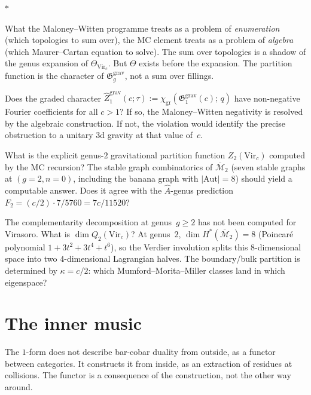 \documentclass[11pt]{article}
\newcommand{\cM}{\mathcal{M}}
\newcommand{\sep}{\bigskip\begin{center}$*$\end{center}\medskip}
\begin{document}
\sep

What the Maloney--Witten programme treats as a problem of
\emph{enumeration} (which topologies to sum over), the MC element
treats as a problem of \emph{algebra} (which Maurer--Cartan
equation to solve).  The sum over topologies is a shadow of the
genus expansion of $\Theta_{\mathrm{Vir}_c}$.  But $\Theta$
exists before the expansion.  The partition function is the
character of $\mathfrak{G}_g^{\mathrm{grav}}$, not a sum over
fillings.

\begin{question}
Does the graded character
$\hat{Z}_1^{\mathrm{grav}}(c;\tau) :=
\chi_{\mathrm{gr}}(\mathfrak{G}_1^{\mathrm{grav}}(c);\,q)$
have non-negative Fourier coefficients for all $c > 1$?
If so, the Maloney--Witten negativity is resolved by the
algebraic construction.  If not, the violation would identify the
precise obstruction to a unitary 3d gravity at that value of~$c$.
\end{question}

\begin{question}
What is the explicit genus-$2$ gravitational partition function
$Z_2(\mathrm{Vir}_c)$ computed by the MC recursion?  The stable
graph combinatorics of $\overline{\cM}_2$ (seven stable graphs at
$(g{=}2, n{=}0)$, including the banana graph with
$|\mathrm{Aut}| = 8$) should yield a computable answer.
Does it agree with the $\hat{A}$-genus prediction
$F_2 = (c/2) \cdot 7/5760 = 7c/11520$?
\end{question}

\begin{question}
The complementarity decomposition at genus~$g \geq 2$ has not been
computed for Virasoro.  What is $\dim Q_2(\mathrm{Vir}_c)$?  At
genus~$2$, $\dim H^\ast(\overline{\cM}_2) = 8$ (Poincar\'e
polynomial $1 + 3t^2 + 3t^4 + t^6$), so the Verdier
involution splits this $8$-dimensional space into two
$4$-dimensional Lagrangian halves.  The boundary/bulk partition
is determined by $\kappa = c/2$: which Mumford--Morita--Miller
classes land in which eigenspace?
\end{question}


\section{The inner music}
\label{sec:coda}

The $1$-form does not describe bar-cobar duality from outside, as a
functor between categories.  It constructs it from inside, as an
extraction of residues at collisions.  The functor is a consequence
of the construction, not the other way around.
\end{document}
